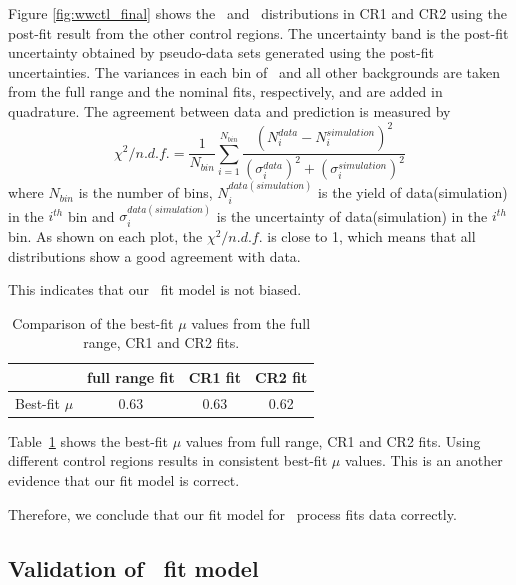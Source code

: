 Figure \ref{fig:wwctl_final} shows the \mT\ and \mll\ distributions in CR1 and CR2 using 
the post-fit result from the other control regions. 
The uncertainty band is the post-fit uncertainty obtained by pseudo-data sets 
generated using the post-fit uncertainties. 
The variances in each bin of \qqww\ and all other backgrounds 
are taken from the full range and the nominal fits, respectively, 
and are added in quadrature. 
The agreement between data and prediction is measured by
\begin{equation} 
\chi^2/n.d.f.
= \frac{1}{N_{bin}} \displaystyle \sum_{i=1}^{N_{bin}}  
  \frac{\left( N^{data}_i - N^{simulation}_i \right)^2}
       {\left( \sigma^{data}_i \right)^2 + \left( \sigma^{simulation}_i \right)^2}   
\end{equation}  
where $N_{bin}$ is the number of bins, 
$N^{data(simulation)}_i$ is the yield of data(simulation) in the $i^{th}$ bin
and $\sigma^{data(simulation)}_i$ is the uncertainty of data(simulation) 
in the $i^{th}$ bin. As shown on each plot, the $\chi^2/n.d.f.$
is close to 1, which means that all distributions show a good agreement with data.

This indicates that our \qqww\ fit model is not biased.
%
\begin{table}
\begin{center}
\begin{tabular}{c|ccc}
\hline
                    & full range fit    & CR1 fit   & CR2 fit   \\
\hline \hline
Best-fit $\mu$      & 0.63              & 0.63      & 0.62      \\
\hline
\end{tabular}
\end{center}
\caption{Comparison of the best-fit $\mu$ values from the full range, CR1 and CR2 fits.} 
\label{tab:bestfitmu_compare}
\end{table}

Table~\ref{tab:bestfitmu_compare} shows the best-fit $\mu$ values from full range, 
CR1 and CR2 fits. Using different control regions results in consistent 
best-fit $\mu$ values. 
This is an another evidence that our fit model is correct. 

Therefore, we conclude that our fit model for \qqww\ process fits data correctly.  

\subsection{Validation of \topbkg\ fit model} 


